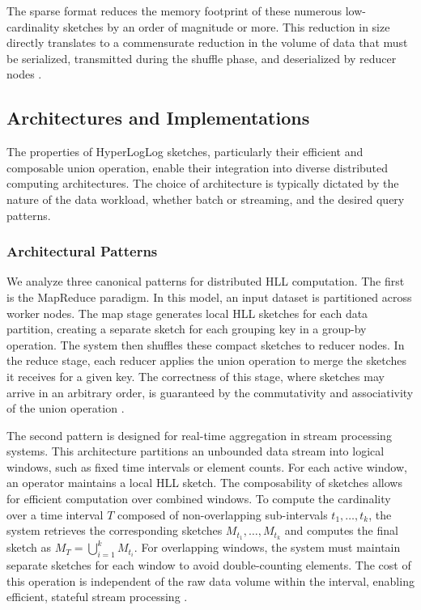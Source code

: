 The sparse format reduces the memory footprint of these numerous low-cardinality sketches by an order of magnitude or more. This reduction in size directly translates to a commensurate reduction in the volume of data that must be serialized, transmitted during the shuffle phase, and deserialized by reducer nodes \cite{Heule2013HyperLogLogIP}.

\subsection{Architectures and Implementations}

The properties of HyperLogLog sketches, particularly their efficient and composable union operation, enable their integration into diverse distributed computing architectures. The choice of architecture is typically dictated by the nature of the data workload, whether batch or streaming, and the desired query patterns.

\subsubsection{Architectural Patterns} \label{subsubsec:hll-patterns}

We analyze three canonical patterns for distributed HLL computation. The first is the MapReduce paradigm. In this model, an input dataset is partitioned across worker nodes. The map stage generates local HLL sketches for each data partition, creating a separate sketch for each grouping key in a group-by operation. The system then shuffles these compact sketches to reducer nodes. In the reduce stage, each reducer applies the union operation to merge the sketches it receives for a given key. The correctness of this stage, where sketches may arrive in an arbitrary order, is guaranteed by the commutativity and associativity of the union operation \cite{Zaharia2012ResilientDD}.

The second pattern is designed for real-time aggregation in stream processing systems. This architecture partitions an unbounded data stream into logical windows, such as fixed time intervals or element counts. For each active window, an operator maintains a local HLL sketch. The composability of sketches allows for efficient computation over combined windows. To compute the cardinality over a time interval $T$ composed of non-overlapping sub-intervals $t_1, \ldots, t_k$, the system retrieves the corresponding sketches $M_{t_1}, \ldots, M_{t_k}$ and computes the final sketch as $M_T = \bigcup_{i=1}^{k} M_{t_i}$. For overlapping windows, the system must maintain separate sketches for each window to avoid double-counting elements. The cost of this operation is independent of the raw data volume within the interval, enabling efficient, stateful stream processing \cite{Huang2016TowardHD}.

